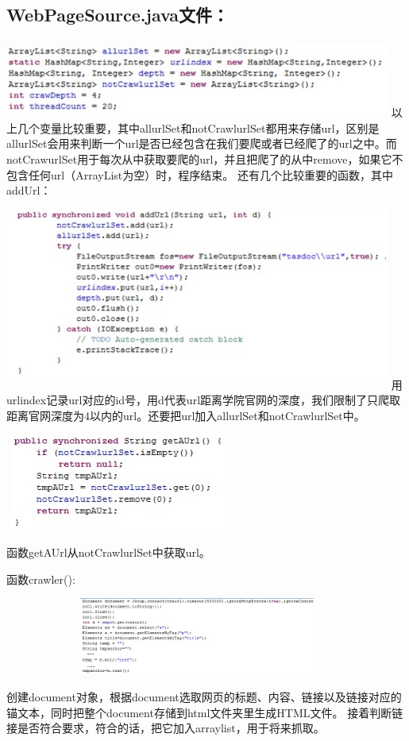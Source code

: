 ﻿\documentclass[UTF8]{ctexart}
\begin{document}
\begin{flushleft}
\subsection{WebPageSource.java文件：}
\includegraphics[width=5.00in,height=1.00in]{figure1.jpg}
    以上几个变量比较重要，其中allurlSet和notCrawlurlSet都用来存储url，区别是allurlSet会用来判断一个url是否已经包含在我们要爬或者已经爬了的url之中。而notCrawurlSet用于每次从中获取要爬的url，并且把爬了的从中remove，如果它不包含任何url（ArrayList为空）时，程序结束。
还有几个比较重要的函数，其中addUrl：
\includegraphics[width=5.00in,height=2.50in]{figure2.jpg}
    用urlindex记录url对应的id号，用d代表url距离学院官网的深度，我们限制了只爬取距离官网深度为4以内的url。还要把url加入allurlSet和notCrawlurlSet中。
\par{}
\includegraphics[width=3.00in,height=1.25in]{figure3.jpg}
\par{}
    函数getAUrl从notCrawlurlSet中获取url。
\par{}
    函数crawler():
\par{}
\includegraphics[width=5.00in,height=1.00in]{figure4.jpg}
\par{}
    创建document对象，根据document选取网页的标题、内容、链接以及链接对应的锚文本，同时把整个document存储到html文件夹里生成HTML文件。
接着判断链接是否符合要求，符合的话，把它加入arraylist，用于将来抓取。

\end{flushleft}
\end{document}
